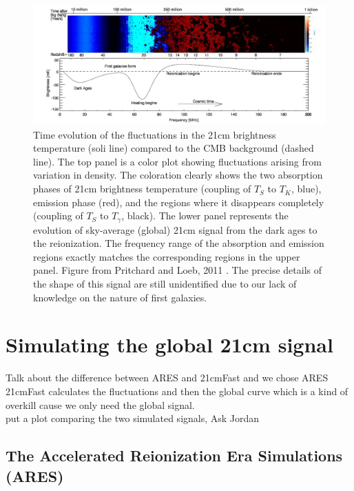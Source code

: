 \documentclass[12pt, TexShade, letterpaper]{report}
\begin{document}
\begin{figure}[h!]

\centering
\includegraphics[scale =0.8]{global_signal_pritchard_loeb.jpg}
\caption[Time evolution of the fluctuations in the 21cm brightness temperature]{Time evolution of the fluctuations in the 21cm brightness temperature (soli line) compared to the CMB background (dashed line). The top panel is a color plot showing fluctuations arising from variation in density. The coloration clearly shows the two absorption phases of 21cm brightness temperature (coupling of $T_S$ to $T_K$, blue), emission phase (red), and the regions where it disappears completely (coupling of $T_S$ to $T_\gamma$, black). The lower panel represents the evolution of sky-average (global) 21cm signal from the dark ages to the reionization. The frequency range of the absorption and emission regions exactly matches the corresponding regions in the upper panel. Figure from Pritchard and Loeb, 2011 \cite{21century}. The precise details of the shape of this signal are still unidentified due to our lack of knowledge on the nature of first galaxies\cite{liu2013global}.}
\label{fig:global_signal_pritchard_loeb}
\end{figure}
\section{Simulating the global 21cm signal}
Talk about the difference between ARES and 21cmFast and we chose ARES\\
21cmFast calculates the fluctuations and then the global curve which is a kind of overkill cause we only need the global signal.\\
put a plot comparing the two simulated signals, Ask Jordan
\subsection{The Accelerated Reionization Era Simulations (ARES)}
\cite{ares2014jordan}
\end{document}
